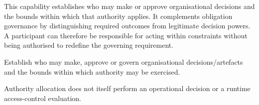 This capability establishes who may make or approve organisational decisions and the bounds within which that authority applies. It complements obligation governance by distinguishing required outcomes from legitimate decision powers. A participant can therefore be responsible for acting within constraints without being authorised to redefine the governing requirement.



Establish who may make, approve or govern organisational decisions/\allowbreak{}artefacts and the bounds within which authority may be exercised.



Authority allocation does not itself perform an operational decision or a runtime access-control evaluation.


